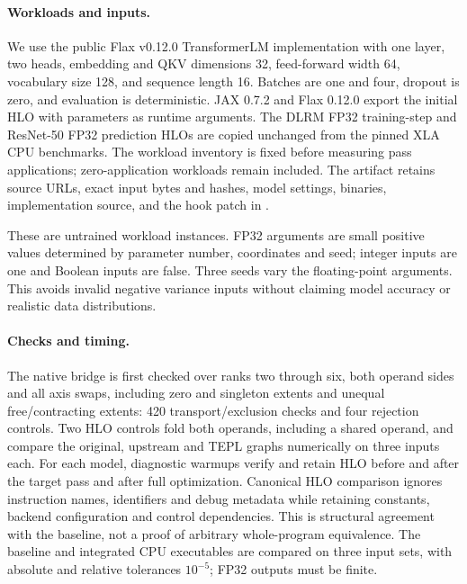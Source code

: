 \paragraph{Workloads and inputs.}
We use the public Flax v0.12.0  TransformerLM implementation
with one layer, two heads, embedding and QKV dimensions 32, feed-forward
width 64, vocabulary size 128, and sequence length 16. Batches are one and
four, dropout is zero, and evaluation is deterministic. JAX 0.7.2 and Flax
0.12.0 export the initial HLO with parameters as runtime arguments.
The DLRM FP32 training-step and ResNet-50 FP32 prediction HLOs are copied
unchanged from the pinned XLA CPU benchmarks. The workload inventory is
fixed before measuring pass applications; zero-application workloads remain
included. The artifact retains source URLs, exact input bytes and hashes,
model settings, binaries, implementation source, and the hook patch in
.

These are untrained workload instances. FP32 arguments are small positive
values determined by parameter number, coordinates and seed; integer inputs
are one and Boolean inputs are false. Three seeds vary the floating-point
arguments. This avoids invalid negative variance inputs without claiming
model accuracy or realistic data distributions.

\paragraph{Checks and timing.}
The native bridge is first checked over ranks two through six, both operand
sides and all axis swaps, including zero and singleton extents and unequal
free/contracting extents: 420 transport/exclusion checks and four rejection
controls. Two HLO controls fold both operands, including a shared operand, and compare
the original, upstream and TEPL graphs numerically on three inputs each.
For each model, diagnostic warmups verify and retain HLO before and after
the target pass and after full optimization. Canonical HLO comparison ignores
instruction names, identifiers and debug metadata while retaining constants, backend
configuration and control dependencies. This is structural agreement with
the baseline, not a proof of arbitrary whole-program equivalence.
The baseline and integrated CPU executables are compared on three
input sets, with absolute and relative tolerances $10^{-5}$; FP32 outputs
must be finite.

